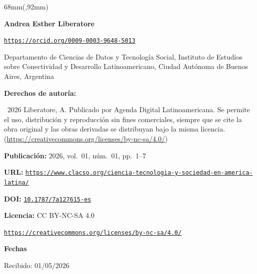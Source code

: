 \begin{textblock*}{68mm}(\gbbloquex,92mm)
{\setlength{\leftskip}{0pt}\setlength{\parindent}{0pt}%
\noindent\begin{minipage}[t]{68mm}
\sffamily\small\setlength{\parskip}{1pt}
{\bfseries\color{azulrevista}Andrea Esther Liberatore}\par
{\scriptsize\texttt{\href{https://orcid.org/0009-0003-9648-5013}{https://orcid.org/0009-0003-9648-5013}}}\par
Departamento de Ciencias de Datos y Tecnología Social, Instituto de Estudios sobre Conectividad y Desarrollo Latinoamericano, Ciudad Autónoma de Buenos Aires, Argentina\par
\vspace{6pt}
{\bfseries\color{azulrevista!70}Derechos de autor\'ia:}\par
\textcopyright\ 2026 Liberatore, A. Publicado por Agenda Digital Latinoamericana. Se permite el uso, distribución y reproducción sin fines comerciales, siempre que se cite la obra original y las obras derivadas se distribuyan bajo la misma licencia. (\href{https://creativecommons.org/licenses/by-nc-sa/4.0/}{https://creativecommons.org/licenses/by-nc-sa/4.0/})\par\vspace{6pt}
{\bfseries\color{azulrevista!70}Publicación:} 2026, vol.~01, n\'um.~01, pp.~1--7\par\vspace{6pt}
{\bfseries\color{azulrevista!70}URL:} {\scriptsize\texttt{\href{https://www.clacso.org/ciencia-tecnologia-y-sociedad-en-america-latina/}{https://www.clacso.org/ciencia-tecnologia-y-sociedad-en-america-latina/}}}\par\vspace{6pt}
{\bfseries\color{azulrevista!70}DOI:} {\scriptsize\texttt{\href{https://doi.org/10.1787/7a127615-es}{10.1787/7a127615-es}}}\par\vspace{6pt}
{\bfseries\color{azulrevista!70}Licencia:} CC BY-NC-SA 4.0\par
{\scriptsize\texttt{\href{https://creativecommons.org/licenses/by-nc-sa/4.0/}{https://creativecommons.org/licenses/by-nc-sa/4.0/}}}\par
\vspace{6pt}
{\bfseries\color{azulrevista!70}Fechas}\par\vspace{2pt}
Recibido: 01/05/2026\par

\end{minipage}}
\end{textblock*}
